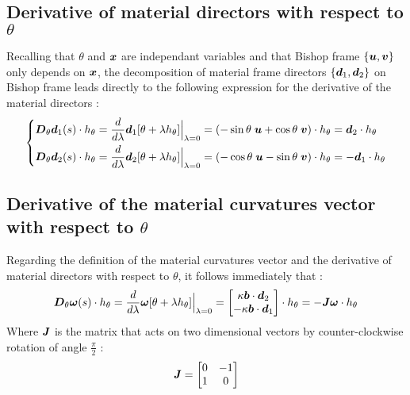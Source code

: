 \subsection{Derivative of material directors with respect to $\theta$}

Recalling that $\theta$ and $\boldsymbol{x}$ are independant variables and that Bishop frame $\{\boldsymbol{u},\boldsymbol{v}\}$ only depends on $\boldsymbol{x}$, the decomposition of material frame directors $\{\boldsymbol{d}_1,\boldsymbol{d}_2\}$ on Bishop frame leads directly to the following expression for the derivative of the material directors  :
\begin{equation}
	\left\{
	\begin{aligned}
	&\boldsymbol{D}_\theta\boldsymbol{d}_1(s)\cdot h_\theta
	= \frac{d}{d\lambda} \boldsymbol{d}_1[\theta + \lambda h_\theta]\Bigr|_{\lambda = 0}
	= \left(-\sin{\theta}\;\boldsymbol{u} + \cos{\theta}\;\boldsymbol{v}\right) \cdot h_\theta
	= \boldsymbol{d}_2\cdot h_\theta \\
	&\boldsymbol{D}_\theta\boldsymbol{d}_2(s)\cdot h_\theta
	= \frac{d}{d\lambda} \boldsymbol{d}_2[\theta + \lambda h_\theta]\Bigr|_{\lambda = 0}
	= \left(-\cos{\theta}\;\boldsymbol{u} - \sin{\theta}\;\boldsymbol{v}\right) \cdot h_\theta
	= -\boldsymbol{d}_1\cdot h_\theta	
	\end{aligned}
	\right.
\end{equation}

\subsection{Derivative of the material curvatures vector with respect to $\theta$}
Regarding the definition of the material curvatures vector and the derivative of material directors with respect to $\theta$, it follows immediately that :
\begin{equation}
			\boldsymbol{D}_\theta\boldsymbol{\omega}(s)\cdot h_\theta
	= \frac{d}{d\lambda} \boldsymbol{\omega}[\theta + \lambda h_\theta]\Bigr|_{\lambda = 0}
	= \begin{bmatrix}
		\kappa\boldsymbol{b}\cdot\boldsymbol{d}_2\\
		-\kappa\boldsymbol{b}\cdot\boldsymbol{d}_1\\
	\end{bmatrix}\cdot h_\theta
	= - \boldsymbol{\mathit{J}}\boldsymbol{\omega}\cdot h_\theta\\
\end{equation}
Where $\boldsymbol{\mathit{J}}$ is the matrix that acts on
two dimensional vectors by counter-clockwise rotation of angle $\frac{\pi}{2}$ : 
\begin{equation}
	\boldsymbol{\mathit{J}} = \begin{bmatrix}
			0	&	-1\\
			1	&	0\\
		\end{bmatrix}
\end{equation}

